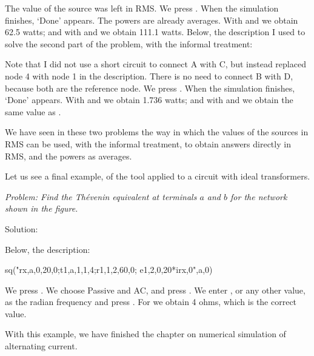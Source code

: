 The value of the source was left in RMS. We press . When
the simulation finishes, `Done' appears. The powers are already
averages. With  and \key{$\diamond$}  we
obtain 62.5 watts; and with  and \key{$\diamond$}
 we obtain 111.1 watts. Below, the description I used to
solve the second part of the problem, with the informal treatment:


Note that I did not use a short circuit to connect A with C, but
instead replaced node 4 with node 1 in the description. There is no
need to connect B with D, because both are the reference node. We
press . When the simulation finishes, `Done' appears.
With  and \key{$\diamond$}  we obtain
1.736 watts; and with  and \key{$\diamond$}
 we obtain the same value as .

We have seen in these two problems the way in which the values of
the sources in RMS can be used, with the informal treatment, to
obtain answers directly in RMS, and the powers as averages.

Let us see a final example, of the  tool applied to a
circuit with ideal transformers.


\emph{Problem: Find the Th\'evenin equivalent at terminals $a$ and
$b$ for the network shown in the figure.}

Solution:

Below, the description:

\begin{entry}
sq\thevenin("rx,a,0,20,0;t1,a,1,1,4;r1,1,2,60,0;
            e1,2,0,20*irx,0",a,0)
\end{entry}

We press . We choose Passive and AC, and press
. We enter , or any other value, as the radian
frequency and press . For  we obtain 4 ohms,
which is the correct value.

With this example, we have finished the chapter on numerical
simulation of alternating current.
